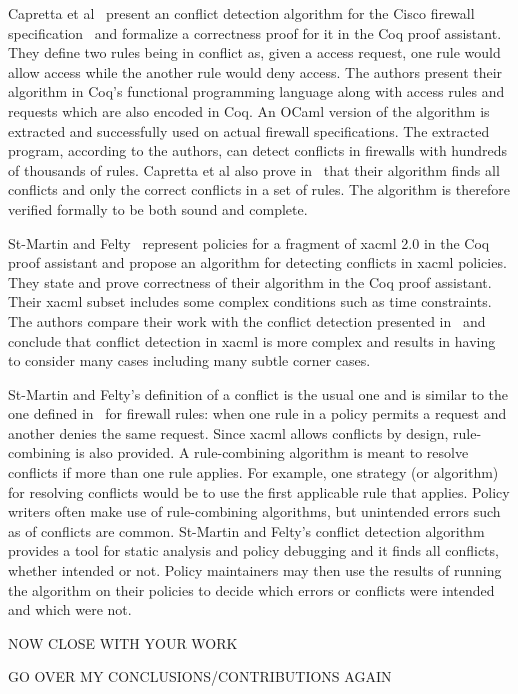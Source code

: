 Capretta et al~\cite{CaprettaSFM07} present an conflict detection algorithm for the Cisco firewall specification~\cite{ciscofirewall} and formalize a correctness proof for it in the Coq proof assistant. They define two rules being in conflict as, given a access request, one rule would allow access while the another rule would deny access. The authors present their algorithm in Coq's functional programming language along with access rules and requests which are also encoded in Coq. An OCaml version of
the algorithm is extracted and successfully used on actual firewall specifications. The extracted program, according to the authors, can detect conflicts in firewalls with hundreds of thousands of rules. Capretta et al also prove in~\cite{CaprettaSFM07} that their algorithm finds all conflicts and only the correct conflicts in a set of rules. The algorithm is therefore verified formally to be both sound and complete.

St-Martin and Felty~\cite{Stmartin} represent policies for a fragment of \ac{xacml} 2.0 in the Coq proof assistant and propose an algorithm for detecting conflicts in \ac{xacml} policies. They state and prove correctness of their algorithm in the Coq proof assistant. Their \ac{xacml} subset includes some complex conditions such as time constraints. The authors compare their work with the conflict detection presented in~\cite{CaprettaSFM07} and conclude that conflict detection in \ac{xacml} is more complex and results in having to consider many cases including many subtle corner cases. 

St-Martin and Felty's definition of a conflict is the usual one and is similar to the one defined in~\cite{CaprettaSFM07} for firewall rules: when one rule in a policy permits a request and another denies the same request. Since \ac{xacml} allows conflicts by design, rule-combining is also provided. A rule-combining algorithm is meant to resolve conflicts if more than one rule applies. For example, one strategy (or algorithm) for resolving conflicts would be to use the first applicable rule that applies. Policy writers often make use of rule-combining algorithms, but unintended errors such as of conflicts are common.
St-Martin and Felty's conflict detection algorithm provides a tool for static analysis and policy debugging and it finds all conflicts, whether intended or not. Policy maintainers may then use the results of running the algorithm on their policies to decide which errors or conflicts were intended and which were not.


NOW CLOSE WITH YOUR WORK


GO OVER MY CONCLUSIONS/CONTRIBUTIONS AGAIN





























